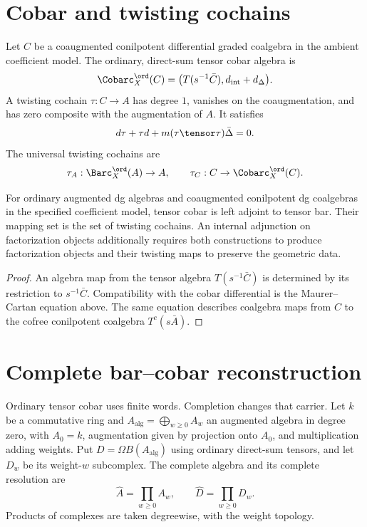 \chapter{Cobar and twisting cochains}
Let $C$ be a coaugmented conilpotent differential graded coalgebra in the ambient
coefficient model. The ordinary, direct-sum tensor cobar algebra is
\[
 \Cobarc_X^{\ord}(C)=
 \bigl(T(s^{-1}\bar C),d_{\mathrm{int}}+d_\Delta\bigr).
\]
A twisting cochain $\tau:C\to A$ has degree $1$, vanishes on the coaugmentation,
and has zero composite with the augmentation of $A$. It satisfies
\[
 d\tau+\tau d+m(\tau\tensor\tau)\bar\Delta=0.
\]
The universal twisting cochains are
\[
 \tau_A:\Barc_X^{\ord}(A)\to A,
 \qquad
 \tau_C:C\to\Cobarc_X^{\ord}(C).
\]

\begin{theorem}
For ordinary augmented dg algebras and coaugmented conilpotent dg coalgebras
in the specified coefficient model, tensor cobar is left adjoint to tensor bar.
Their mapping set is the set of twisting cochains.
An internal adjunction on factorization objects additionally requires both constructions
to produce factorization objects and their twisting maps to preserve the geometric data.
\end{theorem}
\begin{proof}
An algebra map from the tensor algebra $T(s^{-1}\bar C)$ is determined by its restriction to $s^{-1}\bar C$. Compatibility with the cobar differential is the Maurer--Cartan equation above. The same equation describes coalgebra maps from $C$ to the cofree conilpotent coalgebra $T^c(s\bar A)$.
\end{proof}

\chapter{Complete bar--cobar reconstruction}
Ordinary tensor cobar uses finite words. Completion changes that carrier.
Let $k$ be a commutative ring and
$A_{\mathrm{alg}}=\bigoplus_{w\ge0}A_w$ an augmented algebra in degree zero,
with $A_0=k$, augmentation given by projection onto $A_0$, and multiplication adding weights.
Put $D=\Omega B(A_{\mathrm{alg}})$ using ordinary direct-sum tensors,
and let $D_w$ be its weight-$w$ subcomplex.
The complete algebra and its complete resolution are
\[
 \widehat A=\prod_{w\ge0}A_w,\qquad
 \widehat D=\prod_{w\ge0}D_w.
\]
Products of complexes are taken degreewise, with the weight topology.

